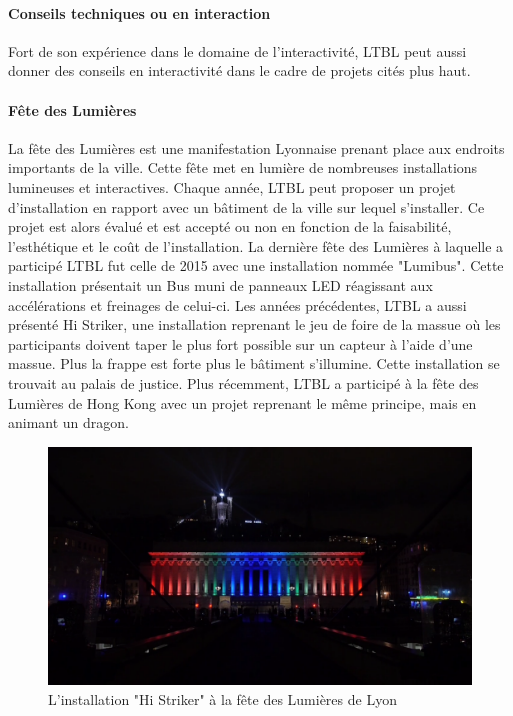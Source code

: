 \documentclass{article}
\begin{document}
\paragraph{Conseils techniques ou en interaction} Fort de son expérience dans le domaine de l'interactivité, LTBL peut aussi donner des conseils en interactivité dans le cadre de projets cités plus haut.

\paragraph{Fête des Lumières} La fête des Lumières est une manifestation Lyonnaise prenant place aux endroits importants de la ville.
Cette fête met en lumière de nombreuses installations lumineuses et interactives.
Chaque année, LTBL peut proposer un projet d'installation en rapport avec un bâtiment de la ville sur lequel s'installer.
Ce projet est alors évalué et est accepté ou non en fonction de la faisabilité, l'esthétique et le coût de l'installation.
La dernière fête des Lumières à laquelle a participé LTBL fut celle de 2015 avec une installation nommée "Lumibus".
Cette installation présentait un Bus muni de panneaux LED réagissant aux accélérations et freinages de celui-ci.
Les années précédentes, LTBL a aussi présenté Hi Striker, une installation reprenant le jeu de foire de la massue où les participants doivent taper le plus fort possible sur un capteur à l'aide d'une massue.
Plus la frappe est forte plus le bâtiment s'illumine.
Cette installation se trouvait au palais de justice.
Plus récemment, LTBL a participé à la fête des Lumières de Hong Kong avec un projet reprenant le même principe, mais en animant un dragon.

\begin{figure}[h]
    \centering
    \includegraphics[scale=0.2]{hi-striker.png}
    \caption{L'installation "Hi Striker" à la fête des Lumières de Lyon}
\end{figure}
\end{document}
